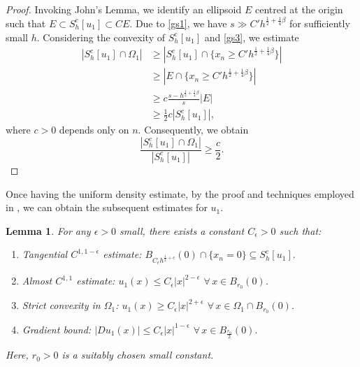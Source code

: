 \documentclass[11pt]{amsart}
\theoremstyle{plain}
\newtheorem{lemma}{Lemma}[section]
\newcommand{\0}{\textbf{0}}
\numberwithin{equation}{section}
\numberwithin{equation}{section}
\numberwithin{figure}{section}
\begin{document}
\begin{proof}
Invoking John's Lemma, we identify an ellipsoid $E$ centred at the origin such that $E \subset S_h^c[u_1] \subset CE$. Due to \eqref{gs1}, we have $s \gg C'h^{\frac{1}{2} + \frac{1}{4}\beta}$ for sufficiently small $h$. Considering the convexity of $S_h^c[u_1]$ and \eqref{gs3}, we estimate
\begin{align*}
\left| S_h^c[u_1] \cap \Omega_1 \right| &\geq \left| S_h^c[u_1] \cap \{x_n \geq C'h^{\frac{1}{2} + \frac{1}{4}\beta}\} \right| \\
&\geq \left| E \cap  \{x_n \geq C'h^{\frac{1}{2} + \frac{1}{4}\beta}\} \right| \\
&\geq c\frac{s - h^{\frac{1}{2} + \frac{1}{4}\beta}}{s} |E| \\
&\geq \frac{1}{2}c |S_h^c[u_1]|,
\end{align*}
where $c > 0$ depends only on $n$. Consequently, we obtain
\[
\frac{|S^c_h[u_1] \cap \Omega_1|}{|S^c_h[u_1]|} \geq \frac{c}{2}.
\]
\end{proof}


Once having the uniform density estimate, by the proof and techniques employed in \cite[Lemma 3.8 and Corollary 3.9]{CLW3}, we can obtain the subsequent estimates for $u_1$.

\begin{lemma}\label{tc14}
For any $\epsilon > 0$ small, there exists a constant $C_\epsilon > 0$ such that:
\begin{enumerate}
    \item Tangential $C^{1, 1-\epsilon}$ estimate: $B_{C_\epsilon h^{\frac{1}{2}+\epsilon}}(0) \cap \{x_n = 0\} \subseteq S_h^c[u_1].$
    \item Almost $C^{1, 1}$ estimate:  $u_1(x) \leq C_\epsilon |x|^{2 - \epsilon}$ $\forall\, x \in B_{r_0}(0)$.
  \item Strict convexity in $\Omega_1$:  $u_1(x) \geq C_\epsilon |x|^{2 + \epsilon}$ $\forall\, x \in \Omega_1 \cap B_{r_0}(0)$.  
    \item Gradient bound: $|Du_1(x)| \leq C_\epsilon |x|^{1 - \epsilon}$ $\forall\, x \in B_{\frac{r_0}{2}}(0).$
\end{enumerate}
Here, $r_0 > 0$ is a suitably chosen small constant.
\end{lemma}
\end{document}
